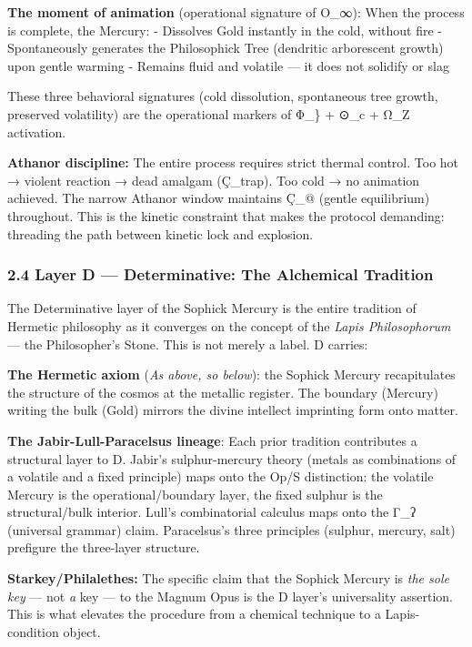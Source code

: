\documentclass[
  11pt,
  a4paper,
]{article}
\begin{document}
\textbf{The moment of animation} (operational signature of O\_∞): When
the process is complete, the Mercury: - Dissolves Gold instantly in the
cold, without fire - Spontaneously generates the Philosophick Tree
(dendritic arborescent growth) upon gentle warming - Remains fluid and
volatile --- it does not solidify or slag

These three behavioral signatures (cold dissolution, spontaneous tree
growth, preserved volatility) are the operational markers of Φ\_\} +
⊙\_c + Ω\_Z activation.

\textbf{Athanor discipline:} The entire process requires strict thermal
control. Too hot → violent reaction → dead amalgam (Ç\_trap). Too cold →
no animation achieved. The narrow Athanor window maintains Ç\_@ (gentle
equilibrium) throughout. This is the kinetic constraint that makes the
protocol demanding: threading the path between kinetic lock and
explosion.

\subsubsection{2.4 Layer D --- Determinative: The Alchemical
Tradition}\label{layer-d-determinative-the-alchemical-tradition}

The Determinative layer of the Sophick Mercury is the entire tradition
of Hermetic philosophy as it converges on the concept of the \emph{Lapis
Philosophorum} --- the Philosopher's Stone. This is not merely a label.
D carries:

\textbf{The Hermetic axiom} (\emph{As above, so below}): the Sophick
Mercury recapitulates the structure of the cosmos at the metallic
register. The boundary (Mercury) writing the bulk (Gold) mirrors the
divine intellect imprinting form onto matter.

\textbf{The Jabir-Lull-Paracelsus lineage}: Each prior tradition
contributes a structural layer to D. Jabir's sulphur-mercury theory
(metals as combinations of a volatile and a fixed principle) maps onto
the Op/S distinction: the volatile Mercury is the operational/boundary
layer, the fixed sulphur is the structural/bulk interior. Lull's
combinatorial calculus maps onto the Γ\_ʔ (universal grammar) claim.
Paracelsus's three principles (sulphur, mercury, salt) prefigure the
three-layer structure.

\textbf{Starkey/Philalethes:} The specific claim that the Sophick
Mercury is \emph{the sole key} --- not \emph{a} key --- to the Magnum
Opus is the D layer's universality assertion. This is what elevates the
procedure from a chemical technique to a Lapis-condition object.
\end{document}
